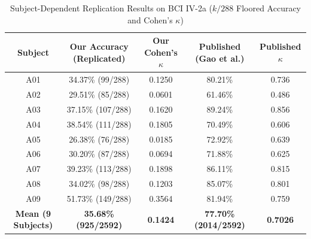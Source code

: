 \documentclass[12pt,a4paper]{report}
\begin{document}
\begin{table}[H]
\centering
\small
\caption{Subject-Dependent Replication Results on BCI IV-2a ($k/288$ Floored Accuracy and Cohen's $\kappa$)}
\label{tab:replication_results}
\begin{tabularx}{\textwidth}{c c c c c}
\toprule
\textbf{Subject} & \textbf{Our Accuracy (Replicated)} & \textbf{Our Cohen's $\kappa$} & \textbf{Published (Gao et al.)} & \textbf{Published $\kappa$} \\
\midrule
A01 & 34.37\% (99/288) & 0.1250 & 80.21\% & 0.736 \\
A02 & 29.51\% (85/288) & 0.0601 & 61.46\% & 0.486 \\
A03 & 37.15\% (107/288) & 0.1620 & 89.24\% & 0.856 \\
A04 & 38.54\% (111/288) & 0.1805 & 70.49\% & 0.606 \\
A05 & 26.38\% (76/288) & 0.0185 & 72.92\% & 0.639 \\
A06 & 30.20\% (87/288) & 0.0694 & 71.88\% & 0.625 \\
A07 & 39.23\% (113/288) & 0.1898 & 86.11\% & 0.815 \\
A08 & 34.02\% (98/288) & 0.1203 & 85.07\% & 0.801 \\
A09 & 51.73\% (149/288) & 0.3564 & 81.94\% & 0.759 \\
\midrule
\textbf{Mean (9 Subjects)} & \textbf{35.68\% (925/2592)} & \textbf{0.1424} & \textbf{77.70\% (2014/2592)} & \textbf{0.7026} \\
\bottomrule
\end{tabularx}
\end{table}
\end{document}
